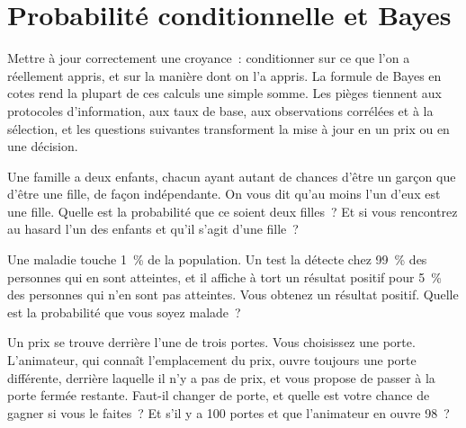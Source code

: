 \chapter{Probabilité conditionnelle et Bayes}\label{ch:iv1:conditional-probability-and-bayes}

\begin{ivtrains}
Mettre à jour correctement une croyance~: conditionner sur ce que l'on a réellement appris, et sur la manière dont on l'a appris. La formule de Bayes en cotes rend la plupart de ces
calculs une simple somme. Les pièges tiennent aux protocoles d'information, aux taux de base, aux observations corrélées et à la sélection, et les
questions suivantes transforment la mise à jour en un prix ou en une décision.
\end{ivtrains}

\begin{question}\label{iq:iv1:conditional-probability-and-bayes:1}
Une famille a deux enfants, chacun ayant autant de chances d'être un garçon que d'être une fille, de façon indépendante. On vous dit qu'au moins l'un d'eux est une fille. Quelle est la probabilité que ce soient deux filles~? Et si vous rencontrez au hasard l'un des enfants et qu'il s'agit d'une fille~?
\end{question}

\begin{question}\label{iq:iv1:conditional-probability-and-bayes:2}
Une maladie touche 1~\% de la population. Un test la détecte chez 99~\% des personnes qui en sont atteintes, et il affiche à tort un résultat positif pour 5~\% des personnes qui n'en sont pas atteintes. Vous obtenez un résultat positif. Quelle est la probabilité que vous soyez malade~?
\end{question}

\begin{question}\label{iq:iv1:conditional-probability-and-bayes:3}
Un prix se trouve derrière l'une de trois portes. Vous choisissez une porte. L'animateur, qui connaît l'emplacement du prix, ouvre toujours une porte différente, derrière laquelle il n'y a pas de prix, et vous propose de passer à la porte fermée restante. Faut-il changer de porte, et quelle est votre chance de gagner si vous le faites~? Et s'il y a 100 portes et que l'animateur en ouvre 98~?
\end{question}

